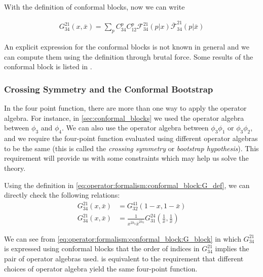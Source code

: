 \documentclass[10pt]{article}
\newenvironment{boxmath}[1]{\begin{tcolorbox}[enhanced,attach boxed title to top center={yshift=-\tcboxedtitleheight/2},boxrule=1pt,title={\centering #1},colframe=NavyBlue!70!black,colback=NavyBlue!10,colbacktitle=NavyBlue!10,fonttitle=\scshape,coltitle=Black]}{\end{tcolorbox}}
\begin{document}
With the definition of conformal blocks, now we can write
\begin{boxmath}{Conformal Block}
    \begin{align}
        G^{21}_{34}(x,\bar{x})=\sum_p C^p_{34} C^p_{12}\mathscr{F}^{21}_{34}(p|x)\bar{\mathscr{F}}^{21}_{34}(p|\bar{x})\label{eq:operator:formalism:conformal_block:G_block}
    \end{align}
\end{boxmath}
\begin{remark}
    An explicit expression for the conformal blocks is not known in general and we can compute them using the definition through brutal force.
    Some results of the conformal block is listed in \cite{DiFrancesco:1997nk}.
\end{remark}
\subsubsection{Crossing Symmetry and the Conformal Bootstrap}
\begin{intu}
    In the four point function, there are more than one way to apply the operator algebra. 
    For instance, in \cref{sec:conformal_blocks} we used the operator algebra between $\phi_3$ and $\phi_4$.
    We can also use the operator algebra between $\phi_3\phi_1$ or $\phi_3\phi_2$, and we require the four-point function evaluated using different operator algebras to be the same (this is called the \textit{crossing symmetry} or \textit{bootstrap hypothesis}).
    This requirement will provide us with some constraints which may help us solve the theory. 
\end{intu}
Using the definition in \cref{eq:operator:formalism:conformal_block:G_def}, we can directly check the following relations:
\begin{subequations}\label{eq:operator:formalism:conformal_bootstrap:relation}
    \begin{align}
        G^{21}_{34}(x,\bar{x})&=G^{41}_{32}(1-x,1-\bar{x})\label{eq:operator:formalism:conformal_bootstrap:relation_1}\\
        G^{21}_{34}(x,\bar{x})&=\frac{1}{x^{2h_3}\bar{x}^{2\bar{h}_3}}G^{24}_{31}\left(\frac{1}{x},\frac{1}{\bar{x}}\right)
    \end{align}
\end{subequations}
\begin{remark}
    We can see from \cref{eq:operator:formalism:conformal_block:G_block} in which $G^{21}_{34}$ is expressed using conformal blocks that the order of indices in $G^{21}_{34}$ implies the pair of operator algebras used. 
     is equivalent to the requirement that different choices of operator algebra yield the same four-point function.
\end{remark}
\end{document}
